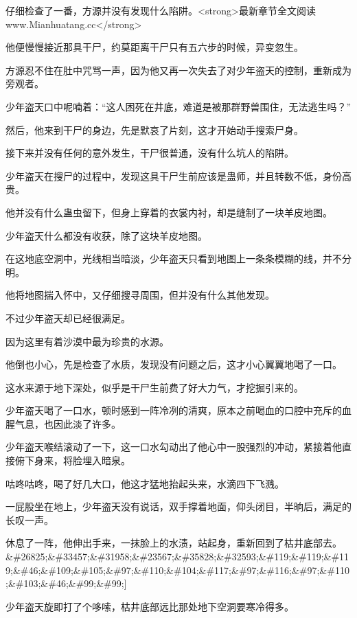 
\begin{this_body}

仔细检查了一番，方源并没有发现什么陷阱。<strong>最新章节全文阅读www.Mianhuatang.cc</strong>

他便慢慢接近那具干尸，约莫距离干尸只有五六步的时候，异变忽生。

方源忍不住在肚中咒骂一声，因为他又再一次失去了对少年盗天的控制，重新成为旁观者。

少年盗天口中呢喃着：“这人困死在井底，难道是被那群野兽围住，无法逃生吗？”

然后，他来到干尸的身边，先是默哀了片刻，这才开始动手搜索尸身。

接下来并没有任何的意外发生，干尸很普通，没有什么坑人的陷阱。

少年盗天在搜尸的过程中，发现这具干尸生前应该是蛊师，并且转数不低，身份高贵。

他并没有什么蛊虫留下，但身上穿着的衣裳内衬，却是缝制了一块羊皮地图。

少年盗天什么都没有收获，除了这块羊皮地图。

在这地底空洞中，光线相当暗淡，少年盗天只看到地图上一条条模糊的线，并不分明。

他将地图揣入怀中，又仔细搜寻周围，但并没有什么其他发现。

不过少年盗天却已经很满足。

因为这里有着沙漠中最为珍贵的水源。

他倒也小心，先是检查了水质，发现没有问题之后，这才小心翼翼地喝了一口。

这水来源于地下深处，似乎是干尸生前费了好大力气，才挖掘引来的。

少年盗天喝了一口水，顿时感到一阵冷冽的清爽，原本之前喝血的口腔中充斥的血腥气息，也因此淡了许多。

少年盗天喉结滚动了一下，这一口水勾动出了他心中一股强烈的冲动，紧接着他直接俯下身来，将脸埋入暗泉。

咕咚咕咚，喝了好几大口，他这才猛地抬起头来，水滴四下飞溅。

一屁股坐在地上，少年盗天没有说话，双手撑着地面，仰头闭目，半晌后，满足的长叹一声。

休息了一阵，他伸出手来，一抹脸上的水渍，站起身，重新回到了枯井底部去。\&\#26825;\&\#33457;\&\#31958;\&\#23567;\&\#35828;\&\#32593;\&\#119;\&\#119;\&\#119;\&\#46;\&\#109;\&\#105;\&\#97;\&\#110;\&\#104;\&\#117;\&\#97;\&\#116;\&\#97;\&\#110;\&\#103;\&\#46;\&\#99;\&\#99;]

少年盗天旋即打了个哆嗦，枯井底部远比那处地下空洞要寒冷得多。


\end{this_body}
